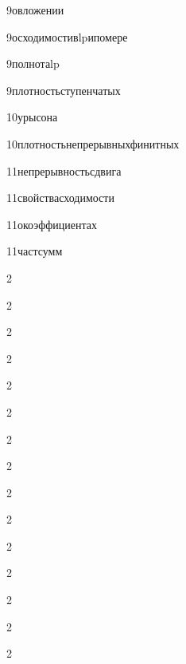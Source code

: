 {9}{овложении}

{9}{осходимостивlpипомере}

{9}{полнотаlp}

{9}{плотностьступенчатых}

{10}{урысона}

{10}{плотностьнепрерывныхфинитных}

{11}{непрерывностьсдвига}

{11}{свойствасходимости}

{11}{окоэффициентах}

{11}{частсумм}

{2}{}

{2}{}

{2}{}

{2}{}

{2}{}

{2}{}

{2}{}

{2}{}

{2}{}

{2}{}

{2}{}

{2}{}

{2}{}

{2}{}

{2}{}


